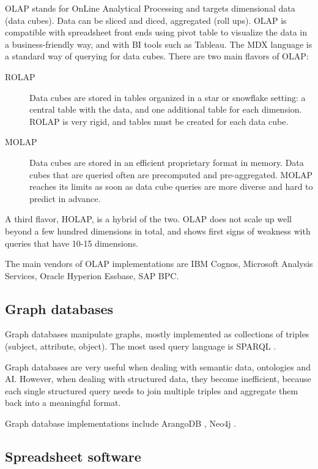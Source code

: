 \documentclass{acm_proc_article-sp}
\begin{document}
OLAP \cite{Codd1993} stands for OnLine Analytical Processing and targets dimensional data (data cubes). Data can be sliced and diced, aggregated (roll ups). OLAP is compatible with spreadsheet front ends using pivot table to visualize the data in a business-friendly way, and with BI tools such as Tableau. The MDX language \cite{Nolan1999} is a standard way of querying for data cubes. There are two main flavors of OLAP:
\begin{description}
\item[ROLAP] Data cubes are stored in tables organized in a star or snowflake setting: a central table with the data, and one additional table for each dimension. ROLAP is very rigid, and tables must be created for each data cube.
\item[MOLAP] Data cubes are stored in an efficient proprietary format in memory. Data cubes that are queried often are precomputed and pre-aggregated. MOLAP reaches its limits as soon as data cube queries are more diverse and hard to predict in advance.
\end{description}

A third flavor, HOLAP, is a hybrid of the two. OLAP does not scale up well beyond a few hundred dimensions in total, and shows first signs of weakness with queries that have 10-15 dimensions.

The main vendors of OLAP implementations are IBM Cognos, Microsoft Analysis Services, Oracle Hyperion Essbase, SAP BPC.

\subsection{Graph databases}

Graph databases manipulate graphs, mostly implemented as collections of triples (subject, attribute, object). The most used query language is SPARQL \cite{SPARQL}.

Graph databases are very useful when dealing with semantic data, ontologies and AI. However, when dealing with structured data, they become inefficient, because each single structured query needs to join multiple triples and aggregate them back into a meaningful format.

Graph database implementations include ArangoDB \cite{ArangoDB}, Neo4j \cite{Neo4j}.

\subsection{Spreadsheet software}
\end{document}
